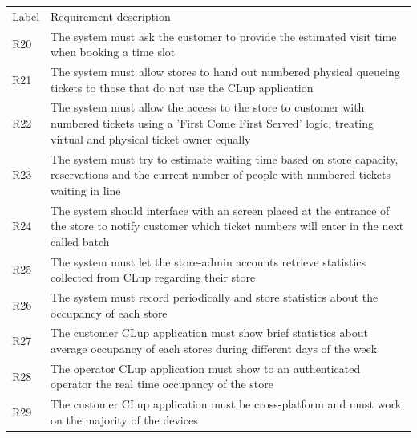 \begin{tabular}{C{1cm}L{14.1cm}}
    Label & Requirement description                                                                                                                                                         \\
    R20   & The system  must ask the customer to provide the estimated visit time when booking a time slot                                                                                  \\
    R21   & The system must allow stores to hand out numbered physical queueing tickets to those that do not use the CLup application                                                       \\
    R22   & The system must allow the access to the store to customer with numbered tickets using a 'First Come First Served' logic, treating virtual and physical ticket owner equally     \\
    R23   & The system must try to estimate waiting time based on store capacity, reservations and the current number of people with numbered tickets waiting in line                       \\
    R24   & The system should interface with an screen placed at the entrance of the store to notify customer which ticket numbers will enter in the next called batch                      \\
    R25   & The system must let the store-admin accounts retrieve statistics collected from CLup regarding their store                                                                      \\
    R26   & The system must record periodically and store statistics about the occupancy of each store                                                                                      \\
    R27   & The customer CLup application must show brief statistics about average occupancy of each stores during different days of the week                                               \\
    R28   & The operator CLup application must show to an authenticated operator the real time occupancy of the store                                                                       \\
    R29   & The customer CLup application must be cross-platform and must work on the majority of the devices                                                                               \\

\end{tabular}
